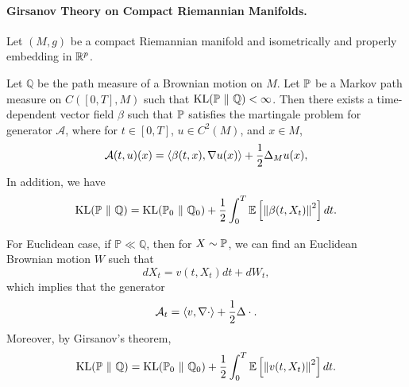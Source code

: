 \paragraph{Girsanov Theory on Compact Riemannian Manifolds.} Let $(M,g)$ be a compact Riemannian manifold and isometrically and properly embedding in $\mathbb{R}^p$.

\begin{thm}
    Let $\mathbb{Q}$ be the path measure of a Brownian motion on $M$. Let $\mathbb{P}$ be a Markov path measure on $C([0,T],M)$ such that $\operatorname{KL}(\mathbb{P} ~\Vert~ \mathbb{Q} ) < \infty$. Then there exists a time-dependent vector field $\beta$ such that $\mathbb{P}$ satisfies the martingale problem for generator $\mathcal{A}$, where for $t \in [0,T]$, $u \in C^2(M)$, and $x \in M$,
    \begin{equation*}
        \mathcal{A}(t,u)(x) = \left\langle \beta(t,x),\nabla u(x) \right\rangle + \frac{1}{2}\Delta_Mu(x),
    \end{equation*}
    In addition, we have 
    \begin{equation*}
        \operatorname{KL}(\mathbb{P} ~\Vert~ \mathbb{Q} ) = \operatorname{KL}(\mathbb{P}_0 ~\Vert~ \mathbb{Q}_0 ) + \frac{1}{2}\int_0^T \mathbb{E}\left[\left\lVert\beta(t,X_t)\right\lVert^2\right]dt.
    \end{equation*}
\end{thm}
\begin{rmk}
    For Euclidean case, if $\mathbb{P} \ll \mathbb{Q}$, then for $X \sim \mathbb{P}$, we can find an Euclidean Brownian motion $W$ such that
    \begin{equation*}
        dX_t = v(t,X_t)dt + dW_t,
    \end{equation*}
    which implies that the generator
    \begin{equation*}
        \mathcal{A}_t = \left\langle v,\nabla \cdot \right\rangle + \frac{1}{2} \Delta \cdot.
    \end{equation*}
    Moreover, by Girsanov's theorem,
    \begin{equation*}
        \operatorname{KL}(\mathbb{P} ~\Vert~ \mathbb{Q} ) = \operatorname{KL}(\mathbb{P}_0 ~\Vert~ \mathbb{Q}_0 ) + \frac{1}{2}\int_0^T \mathbb{E}\left[\left\lVert v(t,X_t)\right\lVert^2\right]dt.
    \end{equation*}
\end{rmk}

